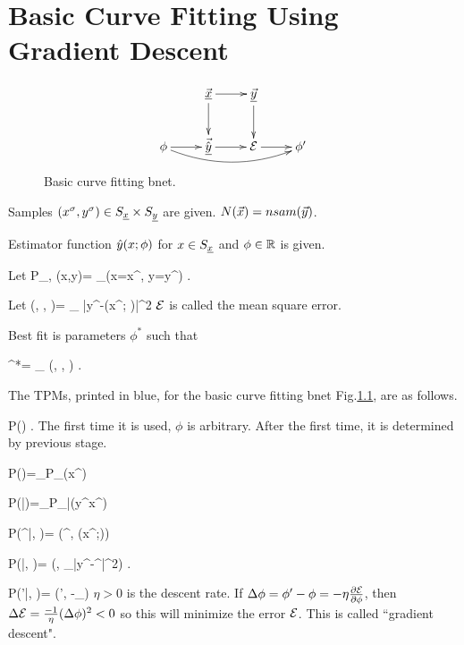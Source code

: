 \chapter{Basic Curve Fitting
Using Gradient Descent}
\label{ch-basic-fit}

\begin{figure}[h!]
\centering
$$\xymatrix{
&\vec{\rvx}\ar[d]\ar[r]&\ul{\vecy}
\ar[d]&\\
\phi\ar[r]\ar@/_1pc/[rrr]&
\vec{\hat{\rvy}}\ar[r]&\cale\ar[r]&\phi'
}$$
\caption{Basic curve fitting bnet.}
\label{fig-bfit}
\end{figure}


Samples 
$(x^\sigma, y^\sigma)\in S_{\underline{x}}\times S_{\underline{y}}$
are given. $N({\vec{x}})=nsam({\vec{y}})$.

Estimator function 
${\hat{y}}(x; \phi)$
for $x\in S_{\underline{x}}$ and $\phi\in{ \mathbb{R}}$
is given.

Let 
\beq
P_{\rvx, \rvy}(x,y)=
\sum_\s \indi(x=x^\s, y=y^\s)
\;.
\eeq


Let 
\beq
\cale(\vecx, \vecy, \phi)=
\sum_\s
|y^\s-\haty(x^\s; \phi)|^2
\;
\eeq
${\cal E}$ is called the mean square error.

Best fit is parameters $\phi^*$
such that

\beq 
\phi^*= \argmin_\phi
\cale(\vecx, \vecy, \phi)
\;.
\eeq

The TPMs, printed in blue, for
the basic curve fitting bnet
 Fig.\ref{fig-bfit}, are
as follows.

\beq\color{blue}
P(\phi) 
\;.
\eeq
The first time
it is used, $\phi$ is arbitrary.
After the first time, it is determined 
by previous stage.

\beq\color{blue}
P(\vecx)=\prod_\s P_\rvx(x^\s)
\eeq

\beq\color{blue}
P(\vecy|\vecx)=\prod_\s P_{\rvy|\rvx}(y^\s\cond x^\s)
\eeq

\beq\color{blue}
P(\haty^\s|\phi, \vecx)=
\delta(\haty^\s, \haty(x^\s;\phi))
\eeq


\beq\color{blue}
P(\cale|\vec{\haty}, \vecy)=
\delta(\cale,
\sum_\s |y^\s-\haty^\s|^2)
\;.
\eeq


\beq\color{blue}
P(\phi'|\phi, \cale)=
\delta(\phi',
\phi-\eta\partial_\phi\cale)
\eeq
$\eta>0$ is the descent rate.
If $\Delta \phi=\phi'-\phi=-\eta 
\frac{\partial{\cal E}}
{\partial \phi}$, then
 $\Delta {\cal E}=\frac{-1}{\eta}
(\Delta\phi)^2<0$  so this will
minimize the error
${\cal E}$.
This is called ``gradient descent".